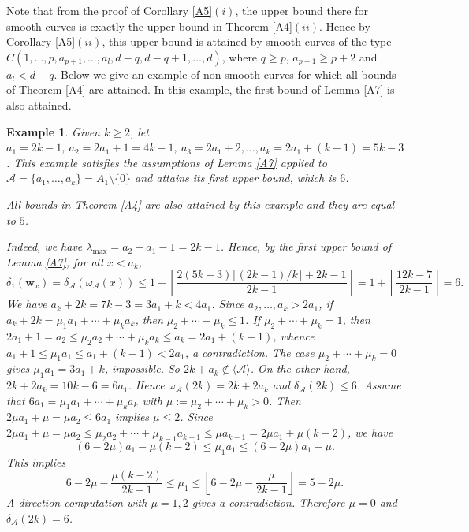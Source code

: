 \documentclass[11pt]{article}
\newtheorem{Example}[Theorem]{Example}
\def\wbf{{\mathbf w}}
\def\Acal{{\mathcal A}}
\theoremstyle{remark}
\theoremstyle{definition}
\begin{document}
Note that  from the proof of  Corollary \ref{A5}\((i)\), the upper bound there for smooth curves is exactly the upper bound in Theorem \ref{A4}\((ii)\). Hence by Corollary \ref{A5}\((ii)\), this upper bound is attained by smooth curves of the type $C(1,\ldots,p, a_{p+1},\ldots, a_l, d-q, d-q+1,\ldots,d)$, where  $q\geq p$, $a_{p+1} \geq p+2$ and $a_l < d-q$. Below we give an example of non-smooth curves for which all  bounds of Theorem \ref{A4} are attained. In this example, the first bound of Lemma \ref{A7} is also attained.

\begin{Example} \label{C1} Given $k\ge 2$, let $a_1 = 2k-1,\ a_2 = 2a_1+1 = 4k-1,\ a_3 = 2a_1 + 2,\ldots, a_k = 2a_1 +(k-1) = 5k-3$. This example satisfies the assumptions of Lemma \ref{A7} applied to $\Acal = \{a_1,\ldots,a_k\} = A_1\setminus \{0\}$ and attains its first upper bound, which is $6$.

All bounds in Theorem \ref{A4} are also attained by this example and they are equal to $5$.

{\rm  Indeed, we have $\lambda_{\max} = a_2 - a_1 - 1 = 2k-1 $. Hence, by  the first upper bound of Lemma \ref{A7}, for all $x< a_k$, 
\begin{equation}\label{EC11}
\delta_1(\wbf_x) = \delta_{\Acal}(\omega_{\Acal}(x)) \leq  1+  \left\lfloor \frac{2 (5k-3) \lfloor (2k-1)/k \rfloor + 2k-1}{2k-1} \right\rfloor = 1+ \left\lfloor \frac{12k-7}{2k-1} \right\rfloor = 6.
\end{equation}
We have $a_k + 2k = 7k-3 = 3a_1 + k < 4a_1$. Since $a_2,\ldots,a_k > 2a_1$, if $a_k + 2k = \mu_1a_1 + \cdots + \mu_k a_k$, then $\mu_2 + \cdots + \mu_k \leq 1$. If $\mu_2 + \cdots + \mu_k = 1$, then $2a_1 + 1 = a_2 \leq \mu_2 a_2 + \cdots + \mu_k a_k \leq a_k = 2a_1 + (k-1)$, whence $a_1+1 \leq \mu_1 a_1 \leq a_1 + (k-1) < 2 a_1$, a contradiction. The case $\mu_2 + \cdots + \mu_k = 0$ gives $\mu_1 a_1 = 3a_1 + k$, impossible. So $2k + a_k \not\in \langle \Acal \rangle$. On the other hand, $2k+ 2a_k = 10k-6 = 6a_1$. Hence $\omega_{\Acal} (2k) = 2k+2a_k$ and $\delta_{\Acal}(2k) \leq 6$. Assume that $6a_1 = \mu_1a_1 + \cdots + \mu_k a_k$ with $\mu:= \mu_2 + \cdots + \mu_k > 0$.
Then $2\mu a_1 + \mu = \mu a_2  \leq 6a_1 $ implies $\mu \leq 2$. Since $2\mu a_1 + \mu = \mu a_2  \leq \mu_2 a_2 + \cdots + \mu_{k-1}a_{k-1} \leq \mu a_{k-1} = 2\mu a_1 + \mu (k-2) $, we have 
$$(6-2\mu)a_1 - \mu(k-2) \leq \mu_1 a_1 \leq (6-2\mu) a_1 - \mu.$$
This implies 
$$6- 2\mu - \frac{\mu(k-2)}{2k-1} \leq \mu_1 \leq \left\lfloor 6-2\mu - \frac{\mu}{2k-1} \right\rfloor = 5-2\mu.$$
A direction computation with $\mu = 1,2$ gives a contradiction. Therefore $\mu= 0$ and $\delta_{\Acal}(2k) = 6$.

}
\end{Example}
\end{document}
